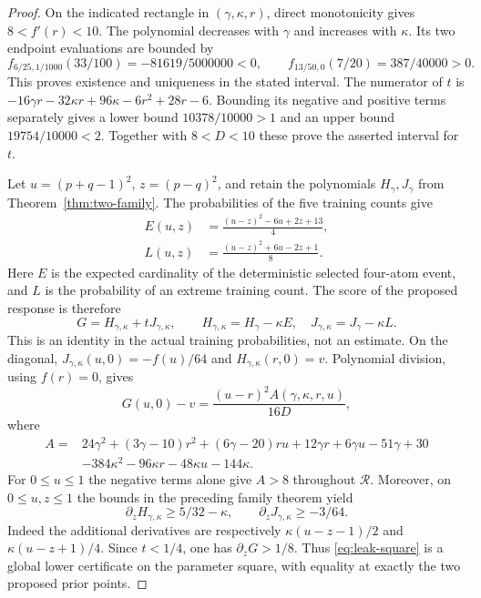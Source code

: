 \begin{proof}
On the indicated rectangle in $(\gamma,\kappa,r)$, direct monotonicity
gives $8<f'(r)<10$. The polynomial decreases with $\gamma$ and
increases with $\kappa$. Its two endpoint evaluations are bounded by
\[
 f_{6/25,1/1000}(33/100)=-81619/5000000<0,
 \qquad f_{13/50,0}(7/20)=387/40000>0.
\]
This proves existence and uniqueness in the stated interval. The
numerator of $t$ is
$-16\gamma r-32\kappa r+96\kappa-6r^2+28r-6$.
Bounding its negative and positive terms separately gives a lower
bound $10378/10000>1$ and an upper bound $19754/10000<2$.
Together with $8<D<10$ these prove the asserted interval for $t$.

Let $u=(p+q-1)^2$, $z=(p-q)^2$, and retain the polynomials
$H_\gamma,J_\gamma$ from Theorem~\ref{thm:two-family}. The probabilities
of the five training counts give
\begin{align*}
 E(u,z)&=\frac{(u-z)^2-6u+2z+13}{4},\\
 L(u,z)&=\frac{(u-z)^2+6u-2z+1}{8}.
\end{align*}
Here $E$ is the expected cardinality of the deterministic selected
four-atom event, and $L$ is the probability of an extreme training
count. The score of the proposed response is therefore
\[
 G=H_{\gamma,\kappa}+tJ_{\gamma,\kappa},\qquad
 H_{\gamma,\kappa}=H_\gamma-\kappa E,\quad
 J_{\gamma,\kappa}=J_\gamma-\kappa L.
\]
This is an identity in the actual training probabilities, not an
estimate. On the diagonal, $J_{\gamma,\kappa}(u,0)=-f(u)/64$ and
$H_{\gamma,\kappa}(r,0)=v$. Polynomial division, using $f(r)=0$, gives
\begin{equation}\label{eq:leak-square}
 G(u,0)-v=\frac{(u-r)^2 A(\gamma,\kappa,r,u)}{16D},
\end{equation}
where
\begin{align*}
 A={}&24\gamma^2+(3\gamma-10)r^2+(6\gamma-20)ru
       +12\gamma r+6\gamma u-51\gamma+30\\
    &-384\kappa^2-96\kappa r-48\kappa u-144\kappa.
\end{align*}
For $0\le u\le1$ the negative terms alone give $A>8$ throughout
$\mathcal R$. Moreover, on $0\le u,z\le1$ the bounds in the preceding
family theorem yield
\[
 \partial_zH_{\gamma,\kappa}\ge5/32-\kappa,\qquad
 \partial_zJ_{\gamma,\kappa}\ge-3/64.
\]
Indeed the additional derivatives are respectively
$\kappa(u-z-1)/2$ and $\kappa(u-z+1)/4$.
Since $t<1/4$, one has $\partial_zG>1/8$. Thus
\eqref{eq:leak-square} is a global lower certificate on the parameter
square, with equality at exactly the two proposed prior points.


\end{proof}
